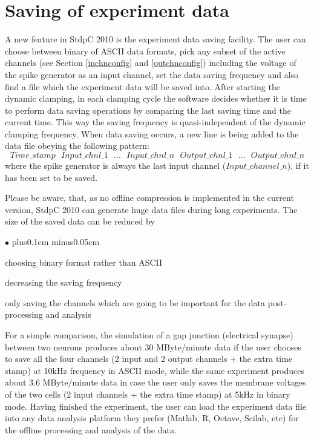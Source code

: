 \documentclass{article}
\newenvironment{myitem}{\begin{list}{$\bullet$}{\setlength{\leftmargin}{1.1em}
\itemsep0.1cm plus0.1cm minus0.05cm
\listparindent0cm
\addtolength{\labelsep}{0.5\labelsep}
\setlength{\labelwidth}{0.8em}
\setlength{\leftmargin}{\labelwidth}
\addtolength{\leftmargin}{\labelsep}
}}{\end{list}}
\begin{document}
\section{Saving of experiment data} \label{datasaving}

A new feature in StdpC 2010 is the experiment data saving
facility. The user can choose between binary of ASCII data formats, pick
any subset of the active channels (see Section \ref{inchnconfig} and
\ref{outchnconfig}) including the voltage of the spike generator as an input
channel, set the data saving frequency and also find a file which the
experiment data will be saved into. After starting the dynamic clamping,  in
each clamping cycle the software decides whether it is time to perform data
saving operations by comparing the last saving time and the current time. This way the
saving frequency is quasi-independent of the dynamic clamping
frequency. When data saving occurs, a new line is being added to the
data file obeying the following pattern:
\begin{equation*}
Time\_stamp\ \ \ Input\_chnl\_1
\ \ \ ...\ \ \ Input\_chnl\_n\ \ \  Output\_chnl\_1\ \ \ ...\ \ \ Output\_chnl\_n  
\end{equation*}
where the spike generator is always the last input channel
($Input\_channel\_n$), if it has been set to be saved.

Please be aware, that, as no offline compression is implemented in the
current version, StdpC 2010 can generate huge data files during long
experiments. The size of the saved data can be reduced by
\begin{myitem} 
\item choosing binary format rather than ASCII
\item decreasing the saving frequency
\item only saving the channels which are going to be important for the data
  post-processing and analysis
\end{myitem}
For a simple comparison, the simulation of a gap junction (electrical
synapse) between two neurons produces about 30 MByte/minute data if the
user chooses to save all the four channels (2 input and 2 output channels
+ the extra time stamp) at 10kHz frequency in ASCII mode, while the same
experiment produces about 3.6 MByte/minute data in case the user only saves the
membrane voltages of the two cells (2 input channels + the extra time
stamp) at 5kHz in binary mode. 
Having finished the experiment, the user can load the experiment data file
into any data analysis platform they prefer (Matlab, R, Octave, Scilab,
etc) for the offline processing and analysis of the data.
\end{document}
